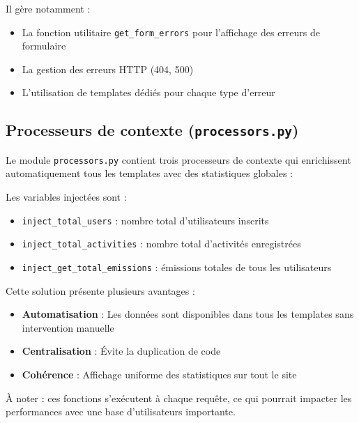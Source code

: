 \documentclass[a4paper,11pt]{article}
\begin{document}
            \noindent Il gère notamment :
            \begin{itemize}
                \item La fonction utilitaire \texttt{get\_form\_errors} pour l'affichage des erreurs de formulaire
                \item La gestion des erreurs HTTP (404, 500)
                \item L'utilisation de templates dédiés pour chaque type d'erreur
            \end{itemize}

        \subsection{Processeurs de contexte (\texttt{processors.py})}
            \noindent Le module \texttt{processors.py} contient trois processeurs de contexte qui enrichissent automatiquement tous les templates avec des statistiques globales :

            

            \noindent Les variables injectées sont :
            \begin{itemize}
                \item \texttt{inject\_total\_users} : nombre total d'utilisateurs inscrits
                \item \texttt{inject\_total\_activities} : nombre total d'activités enregistrées
                \item \texttt{inject\_get\_total\_emissions} : émissions totales de tous les utilisateurs
            \end{itemize}

            \noindent Cette solution présente plusieurs avantages :
            \begin{itemize}
                \item \textbf{Automatisation} : Les données sont disponibles dans tous les templates sans intervention manuelle
                \item \textbf{Centralisation} : Évite la duplication de code
                \item \textbf{Cohérence} : Affichage uniforme des statistiques sur tout le site
            \end{itemize}
            \noindent À noter : ces fonctions s'exécutent à chaque requête, ce qui pourrait impacter les performances avec une base d'utilisateurs importante.
\end{document}
